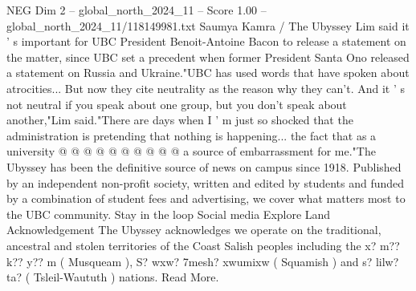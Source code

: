 \begin{textsample}{NEG Dim 2 – global\_north\_2024\_11 – Score 1.00 – global\_north\_2024\_11/118149981.txt}
Saumya Kamra / The Ubyssey Lim said it ' s important for UBC President Benoit-Antoine Bacon to release a statement on the matter, since UBC set a precedent when former President Santa Ono released a statement on Russia and Ukraine."UBC has used words that have spoken about atrocities...
But now they cite neutrality as the reason why they can't.
And it ' s not neutral if you speak about one group, but you don't speak about another,"Lim said."There are days when I ' m just so shocked that the administration is pretending that nothing is happening... the fact that as a university @ @ @ @ @ @ @ @ @ @ a source of embarrassment for me."The Ubyssey has been the definitive source of news on campus since 1918.
Published by an independent non-profit society, written and edited by students and funded by a combination of student fees and advertising, we cover what matters most to the UBC community.
Stay in the loop Social media Explore Land Acknowledgement The Ubyssey acknowledges we operate on the traditional, ancestral and stolen territories of the Coast Salish peoples including the x? m?? k?? y?? m ( Musqueam ), S? wxw? 7mesh? xwumixw ( Squamish ) and s? lilw? ta? ( Tsleil-Waututh ) nations.
Read More.

\end{textsample}
